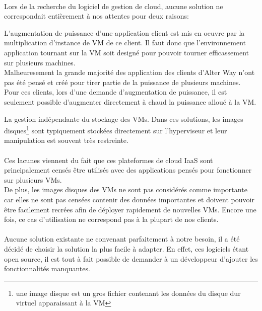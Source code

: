 \paragraph*{}
Lors de la recherche du logiciel de gestion de cloud, aucune solution ne correspondait entièrement à nos attentes pour deux raisons:
\begin{listi}
	\item L'augmentation de puissance d'une application client est mis en oeuvre par la multiplication d'instance de VM de ce client.
		Il faut donc que l'environnement application tournant sur la VM soit designé pour pouvoir tourner efficassement sur
		plusieurs machines.\\
		Malheuresement la grande majorité des application des clients d'Alter Way n'ont pas été pensé et créé pour tirer partie de la
		puissance de plusieurs machines.\\
		Pour ces clients, lors d'une demande d'augmentation de puissance, il est seulement possible d'augmenter directement à chaud
		la puissance alloué à la VM.

	\item La gestion indépendante du stockage des VMs. Dans ces solutions, les images disques\footnote{une image disque est un gros fichier contenant les données
	du disque dur virtuel apparaissant à la VM} sont typiquement stockées directement sur l'hyperviseur et leur manipulation est souvent très restreinte.
\end{listi}

\paragraph*{}
Ces lacunes viennent du fait que ces plateformes de cloud IaaS sont principalement censés être utilisés avec des applications pensés pour fonctionner sur plusieurs VMs. \\
De plus, les images disques des VMs ne sont pas considérés comme importante car elles ne sont pas censées contenir des données importantes et doivent pouvoir être facilement
recrées afin de déployer rapidement de nouvelles VMs. Encore une fois, ce cas d'utilisation ne correspond pas à la plupart de nos clients.

\paragraph*{}
Aucune solution existante ne convenant parfaitement à notre besoin, il a été décidé de choisir la solution la plus facile à adapter.
En effet, ces logiciels étant open source, il est tout à fait possible de demander à un développeur d'ajouter les fonctionnalités manquantes.

